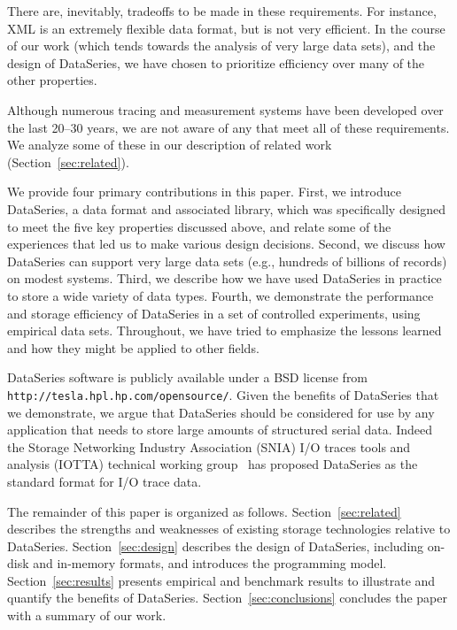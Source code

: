 \documentclass{acm_proc_article-sp}
\begin{document}
There are, inevitably, tradeoffs to be made in these requirements. For
instance, XML is an extremely flexible data format, but is not very
efficient. In the course of our work (which tends towards the analysis
of very large data sets), and the design of DataSeries, we have chosen
to prioritize efficiency over many of the other properties.

Although numerous tracing and measurement systems have been developed
over the last 20--30 years, we are not aware of any that meet all of
these requirements. We analyze some of these in our description of
related work (Section~\ref{sec:related}).

We provide four primary contributions in this paper.  First, we
introduce DataSeries, a data format and associated library, which was
specifically designed to meet the five key properties discussed above,
and relate some of the experiences that led us to make various
design decisions. 
Second, we discuss how DataSeries can support very large data sets
(e.g., hundreds of billions of records) on modest systems.  Third, we
describe how we have used DataSeries in practice to store a wide
variety of data types.  Fourth, we demonstrate the performance and
storage efficiency of DataSeries in a set of controlled experiments,
using empirical data sets. Throughout, we have tried to emphasize the
lessons learned and how they might be applied to other fields.

DataSeries software is publicly available under a BSD license from \texttt{http://tesla.hpl.hp.com/opensource/}. Given the benefits of DataSeries that we demonstrate, we
argue that DataSeries should be considered for use by any application
that needs to store large amounts of structured serial data. Indeed
the Storage Networking Industry Association (SNIA) I/O traces tools
and analysis (IOTTA) technical working group~\cite{iotta-website} has
proposed DataSeries as the standard format for I/O trace data.

The remainder of this paper is organized as follows.
Section~\ref{sec:related} describes the strengths and weaknesses of
existing storage technologies relative to DataSeries.
Section~\ref{sec:design} describes the design of DataSeries, including
on-disk and in-memory formats, and introduces the programming model.
Section~\ref{sec:results} presents empirical and benchmark results
to illustrate and quantify the benefits of
DataSeries. Section~\ref{sec:conclusions} concludes the
paper with a summary of our work.
\end{document}
